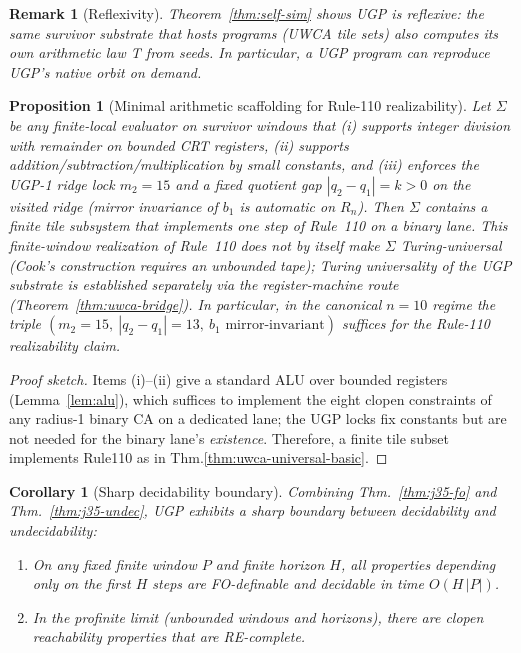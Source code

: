 \documentclass[12pt]{article}
\newtheorem{corollary}[theorem]{Corollary}
\newtheorem{proposition}[theorem]{Proposition}
\newtheorem{remark}[theorem]{Remark}
\numberwithin{equation}{section}
\begin{document}
\begin{remark}[Reflexivity]
Theorem~\ref{thm:self-sim} shows UGP is \emph{reflexive}: the same survivor substrate that hosts programs (UWCA tile sets) also computes its own arithmetic law T from seeds. In particular, a UGP program \emph{can reproduce UGP’s native orbit} on demand.
\end{remark}

\begin{proposition}[Minimal arithmetic scaffolding for Rule-110 realizability]\label{prop:min-scaff}
Let $\Sigma$ be any finite-local evaluator on survivor windows that (i) supports integer division with remainder on bounded CRT registers, (ii) supports addition/subtraction/multiplication by small constants, and (iii) enforces the UGP-1 ridge lock $m_2=15$ and a fixed quotient gap $|q_2-q_1|=k>0$ on the visited ridge (mirror invariance of $b_1$ is automatic on $R_n$). Then $\Sigma$ contains a finite tile subsystem that implements one step of Rule~110 on a binary lane. This finite-window realization of Rule~110 does not by itself make $\Sigma$ Turing-universal (Cook's construction requires an unbounded tape); Turing universality of the UGP substrate is established separately via the register-machine route (Theorem~\ref{thm:uwca-bridge}). In particular, in the canonical $n{=}10$ regime the triple $(m_2{=}15,\ |q_2{-}q_1|{=}13,\ b_1\text{ mirror-invariant})$ suffices for the Rule-110 realizability claim.
\end{proposition}

\begin{proof}[Proof sketch]
Items (i)–(ii) give a standard ALU over bounded registers (Lemma~\ref{lem:alu}), which suffices to implement the eight clopen constraints of any radius-1 binary CA on a dedicated lane; the UGP locks fix constants but are not needed for the binary lane’s \emph{existence}. Therefore, a finite tile subset implements Rule110 as in Thm.\ref{thm:uwca-universal-basic}.
\end{proof}

\begin{corollary}[Sharp decidability boundary]\label{cor:sharp-boundary}
Combining Thm.~\ref{thm:j35-fo} and Thm.~\ref{thm:j35-undec}, UGP exhibits a sharp boundary between decidability and undecidability:
\begin{enumerate}[label=(\roman*)]
\item On any fixed finite window $P$ and finite horizon $H$, all properties depending only on the first $H$ steps are FO-definable and decidable in time $O(H\,|P|)$.
\item In the profinite limit (unbounded windows and horizons), there are clopen reachability properties that are RE-complete.
\end{enumerate}
\end{corollary}
\end{document}
